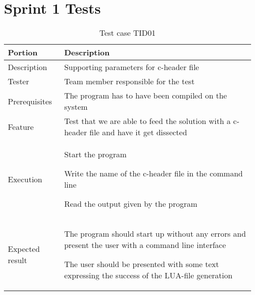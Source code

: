 \section{Sprint 1 Tests}

\begin{table}[ht] \footnotesize \center
\caption{Test case TID01}
\begin{tabularx}{\textwidth}{l X}
	\toprule
	Portion & Description \\
	\midrule
	Description & Supporting parameters for c-header file \\
	Tester & Team member responsible for the test \\
	Prerequisites & The program has to have been compiled on the system \\
	Feature & Test that we are able to feed the solution with a c-header file and have it get dissected \\
	Execution & \begin{packed_enum}
		\item Start the program
		\item Write the name of the c-header file in the command line
		\item Read the output given by the program \end{packed_enum} \\
	Expected result & \begin{packed_enum}
		\item The program should start up without any errors and present the user with a command line interface
		\setcounter{enumi}{2}
		\item The user should be presented with some text expressing the success of the LUA-file generation \end{packed_enum} \\
	\bottomrule
\end{tabularx}
\end{table}

